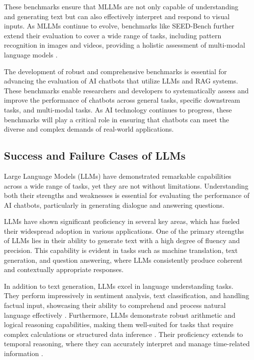 These benchmarks ensure that MLLMs are not only capable of understanding and generating text but can also effectively interpret and respond to visual inputs. As MLLMs continue to evolve, benchmarks like SEED-Bench further extend their evaluation to cover a wide range of tasks, including pattern recognition in images and videos, providing a holistic assessment of multi-modal language models \cite{li2023seed}. \newline

The development of robust and comprehensive benchmarks is essential for advancing the evaluation of AI chatbots that utilize LLMs and RAG systems. These benchmarks enable researchers and developers to systematically assess and improve the performance of chatbots across general tasks, specific downstream tasks, and multi-modal tasks. As AI technology continues to progress, these benchmarks will play a critical role in ensuring that chatbots can meet the diverse and complex demands of real-world applications.

\subsection{Success and Failure Cases of LLMs}

Large Language Models (LLMs) have demonstrated remarkable capabilities across a wide range of tasks, yet they are not without limitations. Understanding both their strengths and weaknesses is essential for evaluating the performance of AI chatbots, particularly in generating dialogue and answering questions.

LLMs have shown significant proficiency in several key areas, which has fueled their widespread adoption in various applications. One of the primary strengths of LLMs lies in their ability to generate text with a high degree of fluency and precision. This capability is evident in tasks such as machine translation, text generation, and question answering, where LLMs consistently produce coherent and contextually appropriate responses.

In addition to text generation, LLMs excel in language understanding tasks. They perform impressively in sentiment analysis, text classification, and handling factual input, showcasing their ability to comprehend and process natural language effectively  . Furthermore, LLMs demonstrate robust arithmetic and logical reasoning capabilities, making them well-suited for tasks that require complex calculations or structured data inference  . Their proficiency extends to temporal reasoning, where they can accurately interpret and manage time-related information .

